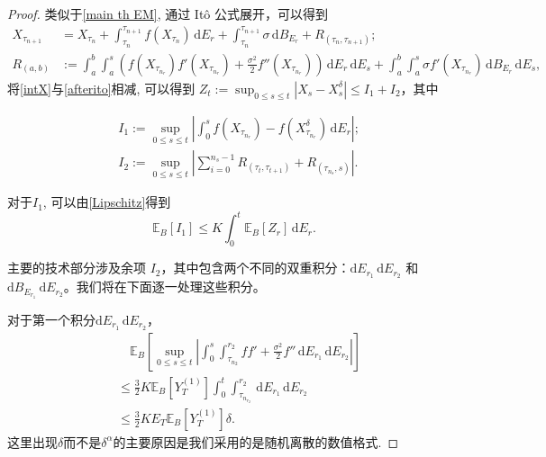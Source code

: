 \begin{proof}
	类似于\cref{main th EM}, 通过 Itô 公式展开，可以得到
	\begin{align}\label{afterito}
		X_{\tau_{n+1}} &= X_{\tau_n} +  \int_{\tau_n}^{\tau_{n+1}} f(X_{\tau_n}) \, \mathrm{d}E_r + \int_{\tau_n}^{\tau_{n+1}} \sigma \, \mathrm{d}B_{E_r} + R_{(\tau_n, \tau_{n+1})}; \\
		R_{(a,b)} &:=  \int_a^b \int_a^{s} \left( f(X_{\tau_{n_{r}}})f'(X_{\tau_{n_{r}}}) + \frac{\sigma ^2}{2} f''(X_{\tau_{n_{r}}})  \right) \, \mathrm{d}E_{r} \, \mathrm{d}E_{s} + \int_a^b \int_a^{s} \sigma f'(X_{\tau_{n_{r}}})   \, \mathrm{d}B_{E_{r}} \,\nonumber \mathrm{d}E_{s},
	\end{align}
	将\cref{intX}与\cref{afterito}相减, 可以得到
	$Z_t := \sup_{0 \leq s \leq t} | X_s - {X_s^\delta} | \leq I_1 + I_2 $，其中
	
	$$
	\begin{aligned}
		&I_1 := \sup_{0 \leq s \leq t} \left| \int_0^s f(X_{\tau_{n_r}}) - f(X_{\tau_{n_r}}^\delta)  \, \mathrm{d}E_r \right|; \\
		&I_2 := \sup_{0 \leq s \leq t} \left| \sum_{i=0}^{n_s - 1} R_{(\tau_{t}, \tau_{t+1})} + R_{(\tau_{n_s}, s)} \right|.
	\end{aligned}
	$$
	
	对于$I_1$, 可以由\cref{Lipschitz}得到
	\begin{equation}\label{I1}
		\mathbb{E}_B[I_1] \leq K \int_0^t \mathbb{E}_B[Z_r] \, \mathrm{d}E_r.
	\end{equation}

	主要的技术部分涉及余项 $I_2$，其中包含两个不同的双重积分：$\mathrm{d}E_{r_1} \, \mathrm{d}E_{r_2}$ 和 $\mathrm{d}B_{E_{r_1}} \, \mathrm{d}E_{r_2}$。我们将在下面逐一处理这些积分。
	
	对于第一个积分$ \mathrm{d}E_{r_1} \, \mathrm{d}E_{r_2}$，
	\begin{align}
		& \quad \mathbb{E}_B \left[\sup_{0 \leq s \leq t} \left| \int_0^s \int_{\tau_{n_2}}^{r_2} ff'  + \frac{\sigma^2}{2} f'' \, \mathrm{d}E_{r_1} \, \mathrm{d}E_{r_2} \right|\right] \nonumber \\
		&\leq  \frac{3}{2}K \mathbb{E}_B[Y_T^{(1)}] \int_0^t \int_{\tau_{n_{r_2}}}^{r_2} \, \mathrm{d}E_{r_1} \, \mathrm{d}E_{r_2} \nonumber \\
		&\leq  \frac{3}{2}K E_T \mathbb{E}_B[Y_T^{(1)}] \delta.  \label{I21}
	\end{align}
	这里出现$\delta$而不是$\delta^{\alpha}$的主要原因是我们采用的是随机离散的数值格式.
	

\end{proof}
